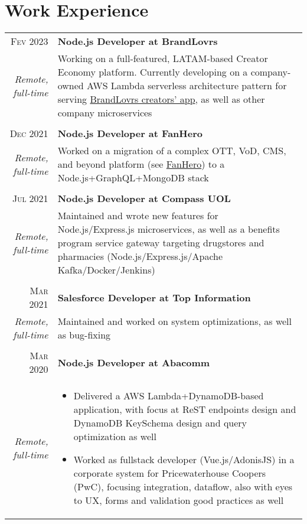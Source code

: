\documentclass[a4paper,10pt]{article}
\begin{document}
\section{Work Experience}
\begin{tabular}{r|p{11cm}}
\textsc{Fev 2023} & \textbf{Node.js Developer at BrandLovrs}\\
\footnotesize{\textit{Remote, full-time}}
  & \footnotesize{Working on a full-featured, LATAM-based Creator Economy platform. Currently developing on a company-owned AWS Lambda serverless architecture pattern for serving \href{https://www.brandlovrs.com/sou-creator}{BrandLovrs creators' app}, as well as other company microservices}\\\\
\textsc{Dec 2021} & \textbf{Node.js Developer at FanHero}\\
\footnotesize{\textit{Remote, full-time}}
  & \footnotesize{Worked on a migration of a complex OTT, VoD, CMS, and beyond platform (see \href{https://fanhero.com}{FanHero}) to a Node.js+GraphQL+MongoDB stack}\\\\
\textsc{Jul 2021} & \textbf{Node.js Developer at Compass UOL}\\
\footnotesize{\textit{Remote, full-time}}
   & \footnotesize{Maintained and wrote new features for Node.js/Express.js microservices, as well as a benefits program service gateway targeting drugstores and pharmacies (Node.js/Express.js/Apache Kafka/Docker/Jenkins)}\\\\
\textsc{Mar 2021} & \textbf{Salesforce Developer at Top Information}\\
\footnotesize{\textit{Remote, full-time}}
 & \footnotesize{Maintained and worked on system optimizations, as well as bug-fixing}\\\\
\textsc{Mar 2020} & \textbf{Node.js Developer at Abacomm}\\
\footnotesize{\textit{Remote, full-time}}
  &\begin{itemize}
    \item \footnotesize{Delivered a AWS Lambda+DynamoDB-based application, with focus at ReST endpoints design and DynamoDB KeySchema design and query optimization as well}
    \item \footnotesize{Worked as fullstack developer (Vue.js/AdonisJS) in a corporate system for Pricewaterhouse Coopers (PwC), focusing integration, dataflow, also with eyes to UX, forms and validation good practices as well}

\end{itemize}
\end{tabular}
\end{document}
